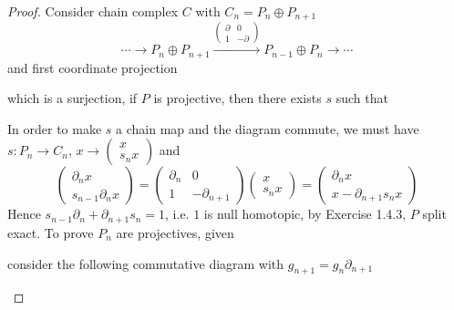 \documentclass[../main.tex]{subfiles}
\begin{document}
\begin{proof}
Consider chain complex $C$ with $C_n=P_n\oplus P_{n+1}$
\[\cdots\to P_n\oplus P_{n+1}\xrightarrow{\begin{pmatrix}
\partial&0 \\
1&-\partial
\end{pmatrix}}P_{n-1}\oplus P_n\to\cdots\]
and first coordinate projection  which is a surjection, if $P$ is projective, then there exists $s$ such that
\begin{center}
\end{center}
In order to make $s$ a chain map and the diagram commute, we must have $s:P_n\to C_n$, $x\to\begin{pmatrix}
x \\
s_nx
\end{pmatrix}$ and
\[\begin{pmatrix}
\partial_nx \\
s_{n-1}\partial_nx
\end{pmatrix}=\begin{pmatrix}
\partial_n&0 \\
1&-\partial_{n+1}
\end{pmatrix}\begin{pmatrix}
x \\
s_nx
\end{pmatrix}=\begin{pmatrix}
\partial_n x \\
x-\partial_{n+1}s_nx
\end{pmatrix}\]
Hence $s_{n-1}\partial_n+\partial_{n+1}s_n=1$, i.e. $1$ is null homotopic, by Exercise 1.4.3, $P$ split exact.
To prove $P_n$ are projectives, given
\begin{center}
\end{center}
consider the following commutative diagram with $g_{n+1}=g_n\partial_{n+1}$
\begin{center}

\end{center}
\end{proof}
\end{document}
